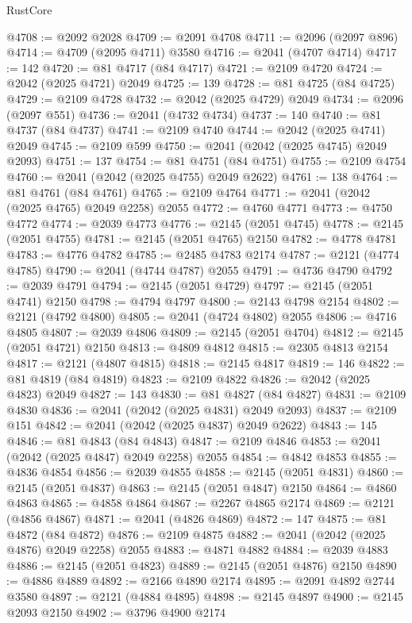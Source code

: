 \begin{lexlean}{RustCore}
\begin{coremodule}
@4708 := @2092 @2028
@4709 := @2091 @4708
@4711 := @2096 (@2097 @896)
@4714 := @4709 (@2095 @4711) @3580
@4716 := @2041 (@4707 @4714)
@4717 := 142
@4720 := @81 @4717 (@84 @4717)
@4721 := @2109 @4720
@4724 := @2042 (@2025 @4721) @2049
@4725 := 139
@4728 := @81 @4725 (@84 @4725)
@4729 := @2109 @4728
@4732 := @2042 (@2025 @4729) @2049
@4734 := @2096 (@2097 @551)
@4736 := @2041 (@4732 @4734)
@4737 := 140
@4740 := @81 @4737 (@84 @4737)
@4741 := @2109 @4740
@4744 := @2042 (@2025 @4741) @2049
@4745 := @2109 @599
@4750 := @2041 (@2042 (@2025 @4745) @2049 @2093)
@4751 := 137
@4754 := @81 @4751 (@84 @4751)
@4755 := @2109 @4754
@4760 := @2041 (@2042 (@2025 @4755) @2049 @2622)
@4761 := 138
@4764 := @81 @4761 (@84 @4761)
@4765 := @2109 @4764
@4771 := @2041 (@2042 (@2025 @4765) @2049 @2258) @2055
@4772 := @4760 @4771
@4773 := @4750 @4772
@4774 := @2039 @4773
@4776 := @2145 (@2051 @4745)
@4778 := @2145 (@2051 @4755)
@4781 := @2145 (@2051 @4765) @2150
@4782 := @4778 @4781
@4783 := @4776 @4782
@4785 := @2485 @4783 @2174
@4787 := @2121 (@4774 @4785)
@4790 := @2041 (@4744 @4787) @2055
@4791 := @4736 @4790
@4792 := @2039 @4791
@4794 := @2145 (@2051 @4729)
@4797 := @2145 (@2051 @4741) @2150
@4798 := @4794 @4797
@4800 := @2143 @4798 @2154
@4802 := @2121 (@4792 @4800)
@4805 := @2041 (@4724 @4802) @2055
@4806 := @4716 @4805
@4807 := @2039 @4806
@4809 := @2145 (@2051 @4704)
@4812 := @2145 (@2051 @4721) @2150
@4813 := @4809 @4812
@4815 := @2305 @4813 @2154
@4817 := @2121 (@4807 @4815)
@4818 := @2145 @4817
@4819 := 146
@4822 := @81 @4819 (@84 @4819)
@4823 := @2109 @4822
@4826 := @2042 (@2025 @4823) @2049
@4827 := 143
@4830 := @81 @4827 (@84 @4827)
@4831 := @2109 @4830
@4836 := @2041 (@2042 (@2025 @4831) @2049 @2093)
@4837 := @2109 @151
@4842 := @2041 (@2042 (@2025 @4837) @2049 @2622)
@4843 := 145
@4846 := @81 @4843 (@84 @4843)
@4847 := @2109 @4846
@4853 := @2041 (@2042 (@2025 @4847) @2049 @2258) @2055
@4854 := @4842 @4853
@4855 := @4836 @4854
@4856 := @2039 @4855
@4858 := @2145 (@2051 @4831)
@4860 := @2145 (@2051 @4837)
@4863 := @2145 (@2051 @4847) @2150
@4864 := @4860 @4863
@4865 := @4858 @4864
@4867 := @2267 @4865 @2174
@4869 := @2121 (@4856 @4867)
@4871 := @2041 (@4826 @4869)
@4872 := 147
@4875 := @81 @4872 (@84 @4872)
@4876 := @2109 @4875
@4882 := @2041 (@2042 (@2025 @4876) @2049 @2258) @2055
@4883 := @4871 @4882
@4884 := @2039 @4883
@4886 := @2145 (@2051 @4823)
@4889 := @2145 (@2051 @4876) @2150
@4890 := @4886 @4889
@4892 := @2166 @4890 @2174
@4895 := @2091 @4892 @2744 @3580
@4897 := @2121 (@4884 @4895)
@4898 := @2145 @4897
@4900 := @2145 @2093 @2150
@4902 := @3796 @4900 @2174

\end{coremodule}
\end{lexlean}
